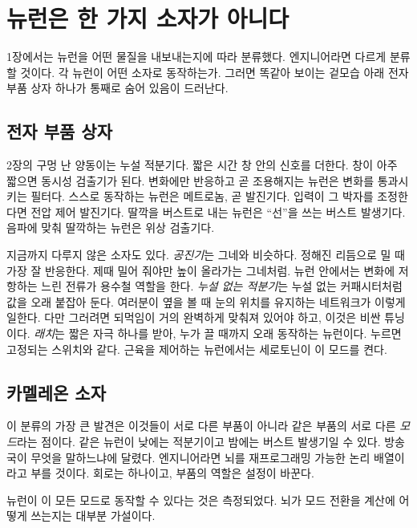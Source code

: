 \chapter{뉴런은 한 가지 소자가 아니다}

1장에서는 뉴런을 어떤 물질을 내보내는지에 따라 분류했다. 엔지니어라면 다르게 분류할 것이다. 각 뉴런이 어떤 소자로 동작하는가. 그러면 똑같아 보이는 겉모습 아래 전자 부품 상자 하나가 통째로 숨어 있음이 드러난다.

\section*{전자 부품 상자}

2장의 구멍 난 양동이는 누설 적분기다. 짧은 시간 창 안의 신호를 더한다. 창이 아주 짧으면 동시성 검출기가 된다. 변화에만 반응하고 곧 조용해지는 뉴런은 변화를 통과시키는 필터다. 스스로 동작하는 뉴런은 메트로놈, 곧 발진기다. 입력이 그 박자를 조정한다면 전압 제어 발진기다. 딸깍을 버스트로 내는 뉴런은 “선”을 쓰는 버스트 발생기다. 음파에 맞춰 딸깍하는 뉴런은 위상 검출기다.


지금까지 다루지 않은 소자도 있다. \emph{공진기}는 그네와 비슷하다. 정해진 리듬으로 밀 때 가장 잘 반응한다. 제때 밀어 줘야만 높이 올라가는 그네처럼. 뉴런 안에서는 변화에 저항하는 느린 전류가 용수철 역할을 한다. \emph{누설 없는 적분기}는 누설 없는 커패시터처럼 값을 오래 붙잡아 둔다. 여러분이 옆을 볼 때 눈의 위치를 유지하는 네트워크가 이렇게 일한다. 다만 그러려면 되먹임이 거의 완벽하게 맞춰져 있어야 하고, 이것은 비싼 튜닝이다. \emph{래치}는 짧은 자극 하나를 받아, 누가 끌 때까지 오래 동작하는 뉴런이다. 누르면 고정되는 스위치와 같다. 근육을 제어하는 뉴런에서는 세로토닌이 이 모드를 켠다.

\section*{카멜레온 소자}

이 분류의 가장 큰 발견은 이것들이 서로 다른 부품이 아니라 같은 부품의 서로 다른 \emph{모드}라는 점이다. 같은 뉴런이 낮에는 적분기이고 밤에는 버스트 발생기일 수 있다. 방송국이 무엇을 말하느냐에 달렸다. 엔지니어라면 뇌를 재프로그래밍 가능한 논리 배열이라고 부를 것이다. 회로는 하나이고, 부품의 역할은 설정이 바꾼다.

뉴런이 이 모든 모드로 동작할 수 있다는 것은 측정되었다. 뇌가 모드 전환을 계산에 어떻게 쓰는지는 대부분 가설이다.

